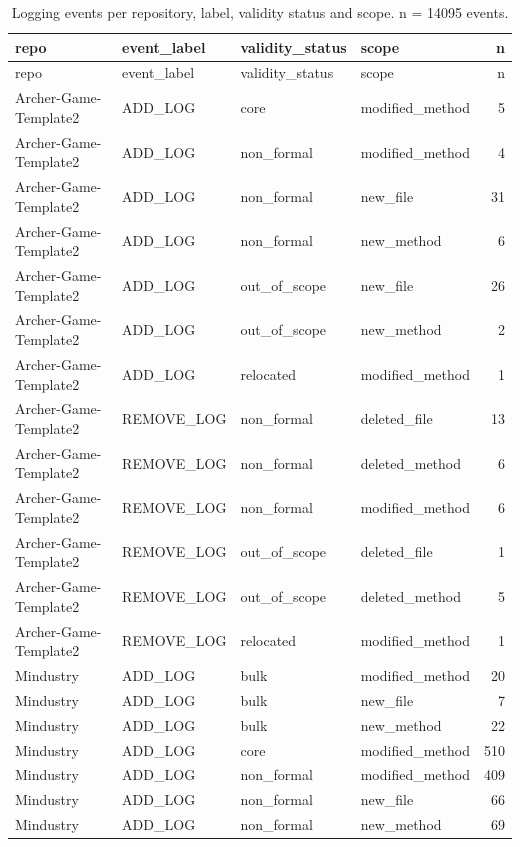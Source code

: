 {\small
\begin{longtable}{llllr}
\caption{Logging events per repository, label, validity status and scope. n = 14095 events.}\label{tab:rq1_events}\\
\toprule
repo & event\_label & validity\_status & scope & n \\
\midrule
\endfirsthead
\toprule
repo & event\_label & validity\_status & scope & n \\
\midrule
\endhead
\bottomrule
\endfoot
Archer-Game-Template2 & ADD\_LOG & core & modified\_method & 5 \\
Archer-Game-Template2 & ADD\_LOG & non\_formal & modified\_method & 4 \\
Archer-Game-Template2 & ADD\_LOG & non\_formal & new\_file & 31 \\
Archer-Game-Template2 & ADD\_LOG & non\_formal & new\_method & 6 \\
Archer-Game-Template2 & ADD\_LOG & out\_of\_scope & new\_file & 26 \\
Archer-Game-Template2 & ADD\_LOG & out\_of\_scope & new\_method & 2 \\
Archer-Game-Template2 & ADD\_LOG & relocated & modified\_method & 1 \\
Archer-Game-Template2 & REMOVE\_LOG & non\_formal & deleted\_file & 13 \\
Archer-Game-Template2 & REMOVE\_LOG & non\_formal & deleted\_method & 6 \\
Archer-Game-Template2 & REMOVE\_LOG & non\_formal & modified\_method & 6 \\
Archer-Game-Template2 & REMOVE\_LOG & out\_of\_scope & deleted\_file & 1 \\
Archer-Game-Template2 & REMOVE\_LOG & out\_of\_scope & deleted\_method & 5 \\
Archer-Game-Template2 & REMOVE\_LOG & relocated & modified\_method & 1 \\
Mindustry & ADD\_LOG & bulk & modified\_method & 20 \\
Mindustry & ADD\_LOG & bulk & new\_file & 7 \\
Mindustry & ADD\_LOG & bulk & new\_method & 22 \\
Mindustry & ADD\_LOG & core & modified\_method & 510 \\
Mindustry & ADD\_LOG & non\_formal & modified\_method & 409 \\
Mindustry & ADD\_LOG & non\_formal & new\_file & 66 \\
Mindustry & ADD\_LOG & non\_formal & new\_method & 69 \\

\end{longtable}}
